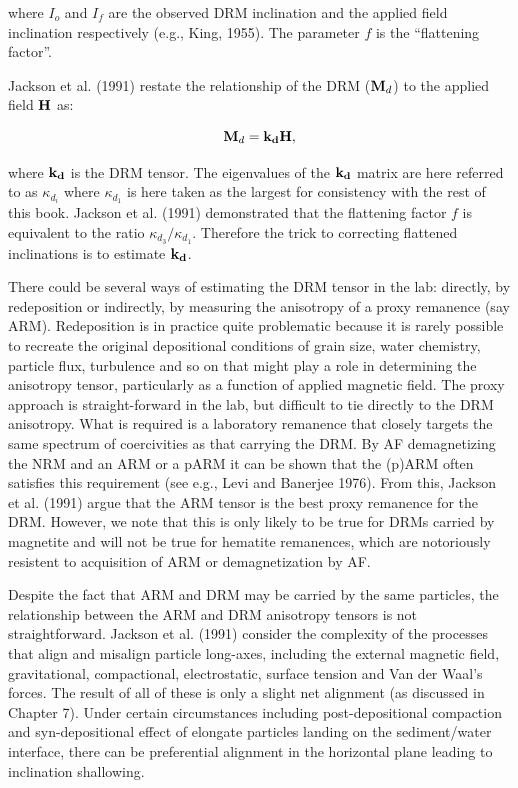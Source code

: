 \noindent
 where $I_o$ and $I_f$ are the observed DRM inclination and  the applied field inclination respectively (e.g., 
 King, 1955).  \nocite{king55} The parameter $f$ is the ``flattening factor''.   
 
Jackson et al. (1991)  \nocite{jackson91}
restate the relationship of the DRM ($\hbox{\bf M}_d$)  to the applied field $\hbox{\bf H}$ as:
 
$$
\hbox{\bf M}_d =  {\bf k_d}  \hbox{\bf H},
$$
 
 \noindent where ${\bf k_d}$ is the DRM tensor.  The eigenvalues of the ${\bf k_d}$ matrix are here referred to as $\kappa_{d_i}$ where $\kappa_{d_1}$ is here taken as the largest for consistency with the rest of this book.    
  Jackson et al. (1991)  demonstrated that the flattening factor $f$ is equivalent to  the ratio $\kappa_{d_3}/\kappa_{d_1}$.  Therefore the trick to correcting flattened inclinations is to estimate ${\bf k_d}$.   
 
There could be  several ways of estimating the DRM tensor in the lab:  directly,  by redeposition or indirectly,  by measuring the anisotropy of a proxy remanence (say ARM).  Redeposition is in practice quite problematic because it is rarely possible to recreate the original depositional conditions of grain size, water chemistry, particle flux, turbulence and so on that might play a role in  determining the anisotropy tensor, particularly as a function of applied magnetic field.  The proxy approach is straight-forward in the lab, but difficult to tie directly to the DRM anisotropy.    What is required is a laboratory remanence that closely targets the same spectrum of coercivities as that carrying the DRM.   By AF demagnetizing the NRM and an ARM or a  pARM     it can be shown that the (p)ARM often satisfies this requirement (see e.g., 
Levi and Banerjee 1976). \nocite{levi76} 
From this, 
 Jackson et al. (1991) argue that the ARM tensor is the best proxy remanence for the DRM.    However, we note that this is only likely to be true for DRMs carried by magnetite and will not be true for hematite remanences, which are notoriously resistent to acquisition of ARM or demagnetization by AF.  

Despite the fact that ARM and DRM may be carried by the same particles, the  relationship between the ARM and DRM anisotropy tensors is not straightforward.   
Jackson et al. (1991) consider the complexity of the processes that align and misalign particle long-axes, including the external magnetic field, gravitational, compactional, electrostatic, surface tension and Van der Waal's forces.   The result of all of these is only a slight net alignment (as discussed in Chapter 7).  Under certain circumstances including post-depositional compaction and syn-depositional effect of elongate particles landing on the sediment/water interface,  there can be preferential alignment in the horizontal plane leading to inclination shallowing.  

